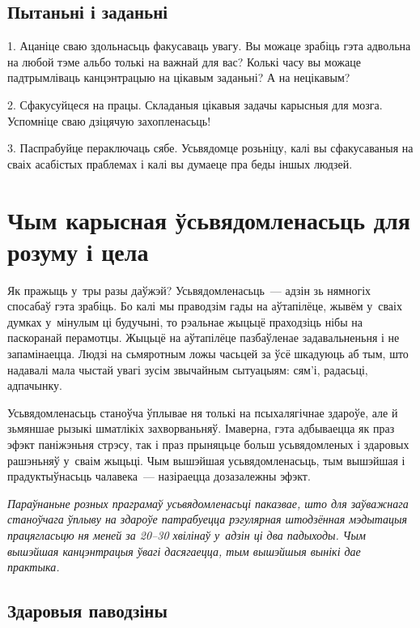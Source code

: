 \subsection*{Пытаньні і заданьні}

1. Ацаніце сваю здольнасьць факусаваць увагу. Вы можаце зрабіць гэта адвольна на любой тэме альбо толькі на важнай для вас? Колькі часу вы можаце падтрымліваць канцэнтрацыю на цікавым заданьні? А на нецікавым?

2. Сфакусуйцеся на працы. Складаныя цікавыя задачы карысныя для мозга. Успомніце сваю дзіцячую захопленасьць!

3. Паспрабуйце пераключаць сябе. Усьвядомце розьніцу, калі вы сфакусаваныя на сваіх асабістых праблемах і калі вы думаеце пра беды іншых людзей.


\section{Чым карысная ўсьвядомленасьць для розуму і цела}

Як пражыць у~тры разы даўжэй? Усьвядомленасьць~--- адзін зь нямногіх спосабаў гэта зрабіць. Бо калі мы праводзім гады на аўтапілёце, жывём у~сваіх думках у~мінулым ці будучыні, то рэальнае жыцьцё праходзіць нібы на паскоранай перамотцы. Жыцьцё на аўтапілёце пазбаўленае задавальненьня і не запамінаецца. Людзі на сьмяротным ложы часьцей за ўсё шкадуюць аб тым, што надавалі мала чыстай увагі зусім звычайным сытуацыям: сям'і, радасьці, адпачынку.


Усьвядомленасьць станоўча ўплывае ня толькі на псыхалягічнае здароўе, але й зьмяншае рызыкі шматлікіх захворваньняў. Імаверна, гэта адбываецца як праз эфэкт паніжэньня стрэсу, так і праз прыняцьце больш усьвядомленых і здаровых рашэньняў у~сваім жыцьці. Чым вышэйшая усьвядомленасьць, тым вышэйшая і прадуктыўнасьць чалавека~--- назіраецца дозазалежны эфэкт.

\emph{Параўнаньне розных праграмаў усьвядомленасьці паказвае, што для заўважнага станоўчага ўплыву на здароўе патрабуецца рэгулярная штодзённая мэдытацыя працягласьцю ня меней за 20--30 хвілінаў у~адзін ці два падыходы. Чым вышэйшая канцэнтрацыя ўвагі дасягаецца, тым вышэйшыя вынікі дае практыка.}

\subsection*{Здаровыя паводзіны}

